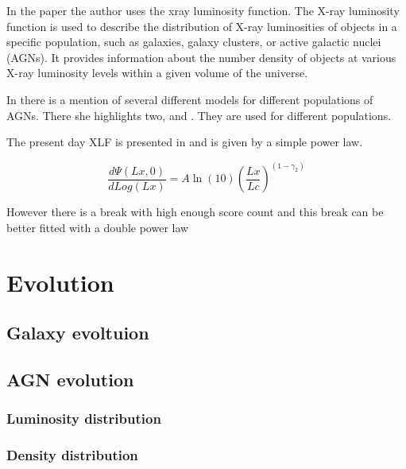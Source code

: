 \documentclass{article}
\begin{document}
In the paper \cite{Jacobsen:2015mga} the author uses the xray luminosity function. The X-ray luminosity function is used to describe the distribution of X-ray luminosities of objects in a specific population, such as galaxies, galaxy clusters, or active galactic nuclei (AGNs). It provides information about the number density of objects at various X-ray luminosity levels within a given volume of the universe.


In \cite{Jacobsen:2015mga} there is a mention of several different models for different populations of AGNs. There she highlights two, \cite{Ajello_2009} and \cite{Ueda_2003}. They are used for different populations.

The present day XLF is presented in \cite{Ajello_2009} and is given by a simple power law. 

\begin{equation}
    \frac{d\Psi(Lx,0)}{dLog(Lx)} = A\ln (10){(\frac{Lx}{Lc})}^{(1-\gamma_2)}
\end{equation}

However there is a break with high enough score count and this break can be better fitted with a double power law 



\section{Evolution}
\subsection{Galaxy evoltuion}
\subsection{AGN evolution}
\subsubsection{Luminosity distribution}
\subsubsection{Density distribution}
\end{document}
